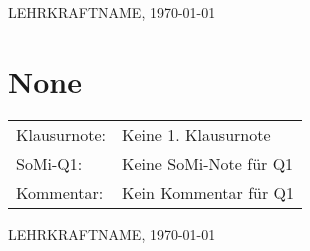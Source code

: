 \documentclass[a6paper,10pt]{scrartcl}
\begin{document}
 \vfill LEHRKRAFTNAME, \today
 \clearpage
 
 
\section*{None} \begin{tabularx}{\textwidth}{lX}
 Klausurnote: &Keine 1. Klausurnote\\
 SoMi-Q1: &Keine SoMi-Note für Q1\\
 Kommentar: &Kein Kommentar für Q1\end{tabularx}

 \vfill LEHRKRAFTNAME, \today
 \clearpage
 
 
\end{document}

